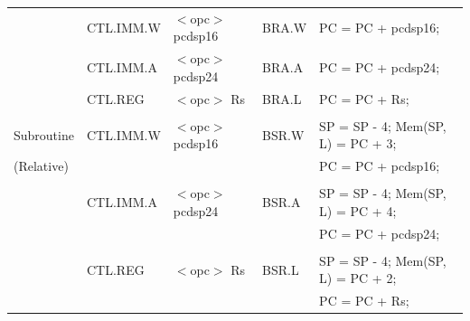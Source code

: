 \begin{table}
\begin{subtable}{\linewidth}
\begin{center}
\begin{tabular}{lllll}
                   & CTL.IMM.W         & $<$opc$>$ pcdsp16                     & BRA.W             & PC = PC + pcdsp16;                                                            \\
                   & CTL.IMM.A         & $<$opc$>$ pcdsp24                     & BRA.A             & PC = PC + pcdsp24;                                                            \\
                   & CTL.REG           & $<$opc$>$ Rs                          & BRA.L             & PC = PC + Rs;                                                                 \\
                   &                   &                                       &                   &                                                                               \\
Subroutine         & CTL.IMM.W         & $<$opc$>$ pcdsp16                     & BSR.W             & SP = SP - 4; Mem(SP, L) = PC + 3;                                             \\
(Relative)         &                   &                                       &                   & PC = PC + pcdsp16;                                                            \\
                   &                   &                                       &                   &                                                                               \\
                   & CTL.IMM.A         & $<$opc$>$ pcdsp24                     & BSR.A             & SP = SP - 4; Mem(SP, L) = PC + 4;                                             \\
                   &                   &                                       &                   & PC = PC + pcdsp24;                                                            \\
                   &                   &                                       &                   &                                                                               \\
                   & CTL.REG           & $<$opc$>$ Rs                          & BSR.L             & SP = SP - 4; Mem(SP, L) = PC + 2;                                             \\
                   &                   &                                       &                   & PC = PC + Rs;                                                                 \\

\end{tabular}
\end{center}
\end{subtable}
\end{table}
